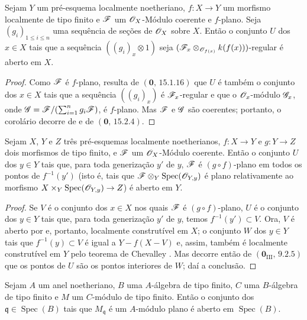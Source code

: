 \begin{corollary}[11.1.4]
\label{IV.11.1.4}
Sejam $Y$ um pré-esquema localmente noetheriano, $f:X\to Y$ um morfismo localmente de tipo finito e $\mathscr{F}$ um $\mathscr{O}_X$-Módulo coerente e $f$-plano. Seja $(g_i)_{1\leq i\leq n}$ uma sequência de seções de $\mathscr{O}_X$ sobre $X$. Então o conjunto $U$ dos $x\in X$ tais que a sequência $((g_i)_x\otimes1)$ seja $(\mathscr{F}_x\otimes_{\mathscr{O}_{f(x)}}k(f(x)))$-regular é aberto em $X$.
\end{corollary}

\begin{proof}

Como $\mathscr{F}$ é $f$-plano, resulta de $(\mathbf 0,\,15.1.16)$ que $U$ é também o conjunto dos $x\in X$ tais que a sequência $((g_i)_x)$ é $\mathscr{F}_x$-regular e que o $\mathscr{O}_x$-módulo $\mathscr{G}_x$, onde $\mathscr{G}=\mathscr{F}/(\sum_{i=1}^n g_i\mathscr{F})$, é $f$-plano. Mas $\mathscr{F}$ e $\mathscr{G}$ são coerentes; portanto, o corolário decorre de  e de $(\mathbf 0,\,15.2.4)$.
\end{proof}

\begin{corollary}[11.1.5]
\label{IV.11.1.5}
Sejam $X$, $Y$ e $Z$ três pré-esquemas localmente noetherianos, $f:X\to Y$ e $g:Y\to Z$ dois morfismos de tipo finito, e $\mathscr{F}$ um $\mathscr{O}_X$-Módulo coerente. Então o conjunto $U$ dos $y\in Y$ tais que, para toda generização $y'$ de $y$, $\mathscr{F}$ é $(g\circ f)$-plano em todos os pontos de $f^{-1}(y')$ (isto é, tais que $\mathscr{F}\otimes_Y\operatorname{Spec}(\mathscr{O}_{Y,y})$ é plano relativamente ao morfismo $X\times_Y\operatorname{Spec}(\sh{O}_{Y,y})\to Z$) é aberto em $Y$.
\end{corollary}

\begin{proof}
Se $V$ é o conjunto dos $x\in X$ nos quais $\mathscr{F}$ é $(g\circ f)$-plano, $U$ é o conjunto dos $y\in Y$ tais que, para toda generização $y'$ de $y$, temos $f^{-1}(y')\subset V$. Ora, $V$ é aberto por  e, portanto, localmente construtível em $X$; o conjunto $W$ dos $y\in Y$ tais que $f^{-1}(y)\subset V$ é igual a $Y-f(X-V)$ e, assim, também é localmente construtível em $Y$ pelo teorema de Chevalley . Mas decorre então de $(\mathbf 0_{\mathrm{III}},\,9.2.5)$ que os pontos de $U$ são os pontos interiores de $W$; daí a conclusão.
\end{proof}

\begin{corollary}[11.1.6]
\label{IV.11.1.6}
Sejam $A$ um anel noetheriano, $B$ uma $A$-álgebra de tipo finito, $C$ uma $B$-álgebra de tipo finito e $M$ um $C$-módulo de tipo finito. Então o conjunto dos $\mathfrak q\in\operatorname{Spec}(B)$ tais que $M_{\mathfrak q}$ é um $A$-módulo plano é aberto em $\operatorname{Spec}(B)$.
\end{corollary}

